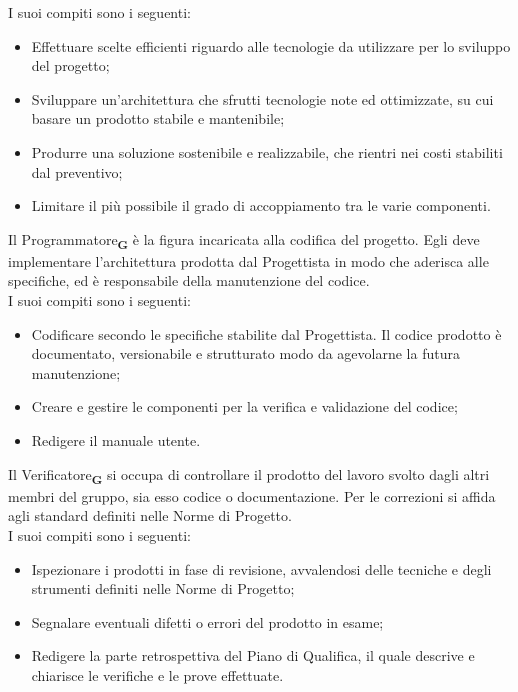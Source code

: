 I suoi compiti sono i seguenti:
\begin {itemize}
    \item Effettuare scelte efficienti riguardo alle tecnologie da utilizzare per lo sviluppo del progetto;
    \item Sviluppare un'architettura che sfrutti tecnologie note ed ottimizzate, su cui basare un prodotto stabile e mantenibile;
    \item Produrre una soluzione sostenibile e realizzabile, che rientri nei costi stabiliti dal preventivo;
    \item Limitare il più possibile il grado di accoppiamento tra le varie componenti.
\end {itemize}
Il Programmatore\textsubscript{\textbf{G}} è la figura incaricata alla codifica del progetto. Egli deve implementare l’architettura prodotta dal Progettista in modo che aderisca alle specifiche, ed è responsabile della manutenzione del codice.\\
I suoi compiti sono i seguenti:
\begin {itemize}
    \item Codificare secondo le specifiche stabilite dal Progettista. Il codice prodotto è documentato, versionabile e strutturato modo da agevolarne la futura manutenzione;
    \item Creare e gestire le componenti per la verifica e validazione del codice;
    \item Redigere il manuale utente.
\end {itemize}
Il Verificatore\textsubscript{\textbf{G}} si occupa di controllare il prodotto del lavoro svolto dagli altri membri del gruppo, sia esso codice o documentazione. Per le correzioni si affida agli standard definiti nelle Norme di Progetto.\\
I suoi compiti sono i seguenti:
\begin {itemize}
    \item Ispezionare i prodotti in fase di revisione, avvalendosi delle tecniche e degli strumenti definiti nelle Norme di Progetto;
    \item Segnalare eventuali difetti o errori del prodotto in esame;
    \item Redigere la parte retrospettiva del Piano di Qualifica, il quale descrive e chiarisce le verifiche e le prove effettuate.
\end {itemize}
